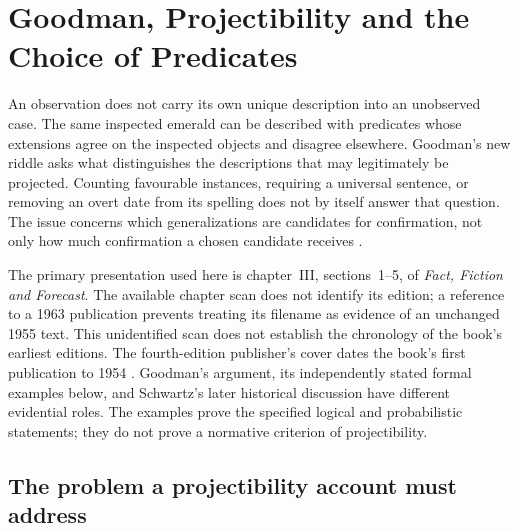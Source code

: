 \chapter{Goodman, Projectibility and the Choice of Predicates}
\label{sec:p15-goodman-projectibility}

An observation does not carry its own unique description into an unobserved
case. The same inspected emerald can be described with predicates whose
extensions agree on the inspected objects and disagree elsewhere. Goodman's
new riddle asks what distinguishes the descriptions that may legitimately
be projected. Counting favourable instances, requiring a universal sentence,
or removing an overt date from its spelling does not by itself answer that
question. The issue concerns which generalizations are candidates for
confirmation, not only how much confirmation a chosen candidate receives
\parencite[III, \S4]{GoodmanNewRiddleTeachingScan}.

The primary presentation used here is chapter~III, sections~1--5, of
\emph{Fact, Fiction and Forecast}. The available chapter scan does not identify
its edition; a reference to a 1963 publication prevents treating its filename
as evidence of an unchanged 1955 text. This unidentified scan does not
establish the chronology of the book's earliest editions.
The fourth-edition publisher's cover dates the book's first publication
to 1954 \parencite[back cover]{Goodman1983FourthProjection}.
Goodman's argument, its independently stated formal examples below, and
Schwartz's later historical discussion have different evidential roles.
The examples prove the specified logical and probabilistic statements;
they do not prove a normative criterion of projectibility.

\section{The problem a projectibility account must address}
\label{sec:p15-goodman-task}

